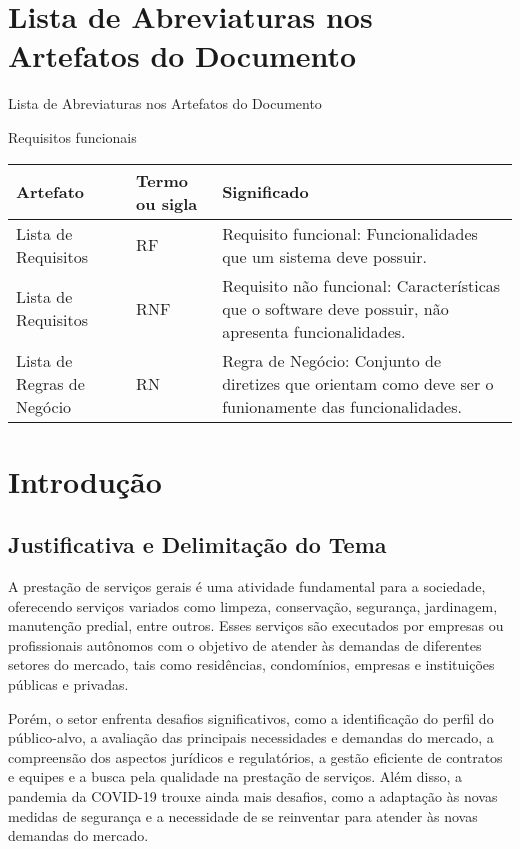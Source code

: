 \chapter{Lista de Abreviaturas nos Artefatos do Documento}
Lista de Abreviaturas nos Artefatos do Documento
\begin{quadro}[htb]
	\centering
	\caption{\label{Formatação do texto.}Requisitos funcionais}	
	\begin{tabular}{|p{4cm}|m{3cm}|p{7cm}|}
		\hline
		\textbf{Artefato} & \textbf{Termo ou sigla} & \textbf{Significado} \\ \hline
		Lista de Requisitos & RF & Requisito funcional: Funcionalidades que um sistema deve possuir. \\ \hline
		Lista de Requisitos & RNF & Requisito não funcional: Características que o software deve possuir, não apresenta funcionalidades. \\ \hline
		Lista de Regras de Negócio & RN & Regra de Negócio: Conjunto de diretizes que orientam como deve ser o funionamente das funcionalidades. \\ \hline
	\end{tabular}
\end{quadro}
\chapter{Introdução}


\section{Justificativa e Delimitação do Tema}

A prestação de serviços gerais é uma atividade fundamental para a sociedade, oferecendo serviços variados como limpeza, conservação, segurança, jardinagem, manutenção predial, entre outros. Esses serviços são executados por empresas ou profissionais autônomos com o objetivo de atender às demandas de diferentes setores do mercado, tais como residências, condomínios, empresas e instituições públicas e privadas.

Porém, o setor enfrenta desafios significativos, como a identificação do perfil do público-alvo, a avaliação das principais necessidades e demandas do mercado, a compreensão dos aspectos jurídicos e regulatórios, a gestão eficiente de contratos e equipes e a busca pela qualidade na prestação de serviços. Além disso, a pandemia da COVID-19 trouxe ainda mais desafios, como a adaptação às novas medidas de segurança e a necessidade de se reinventar para atender às novas demandas do mercado.

